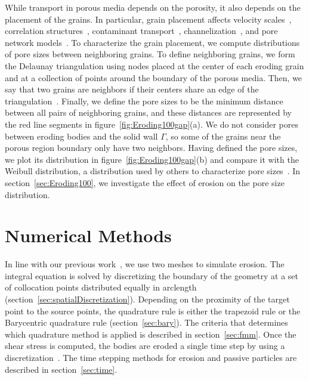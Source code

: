 \documentclass{jfm}
\begin{document}
While transport in porous media depends on the porosity, it also depends
on the placement of the grains.  In particular, grain placement affects
velocity scales~\citep{ali-par-wei-bre2017}, correlation
structures~\citep{leb-ded-dav-bou2007}, contaminant
transport~\citep{knu-car2005},
channelization~\citep{sie-ili-pri-riv-gua2019,berhanu2012shape}, and
pore network models~\citep{bry-kin-mel1993, bry-mel-cad1993,
bij-blu2006}. To characterize the grain placement, we compute
distributions of pore sizes between neighboring grains.  To define
neighboring grains, we form the Delaunay triangulation using nodes
placed at the center of each eroding grain and at a collection of points
around the boundary of the porous media.  Then, we say that two grains
are neighbors if their centers share an edge of the
triangulation~\citep{dea-qua-bir-jua2018}. Finally, we define the pore
sizes to be the minimum distance between all pairs of neighboring
grains, and these distances are represented by the red line segments in
figure~\ref{fig:Eroding100gap}(a). We do not consider pores between
eroding bodies and the solid wall $\Gamma$, so some of the grains near
the porous region boundary only have two neighbors. Having defined the
pore sizes, we plot its distribution in
figure~\ref{fig:Eroding100gap}(b) and compare it with the Weibull
distribution, a distribution used by others to characterize pore
sizes~\citep{ioa-cha1993}. In section~\ref{sec:Eroding100}, we
investigate the effect of erosion on the pore size distribution.

\section{Numerical Methods}
\label{sec:method}
In line with our previous work~\citep{qua-moo2018}, we use two meshes to
simulate erosion. The integral equation is solved by discretizing the
boundary of the geometry at a set of collocation points distributed
equally in arclength (section~\ref{sec:spatialDiscretization}).
Depending on the proximity of the target point to the source points, the
quadrature rule is either the trapezoid rule or the Barycentric
quadrature rule (section~\ref{sec:bary}). The criteria that determines
which quadrature method is applied is described in
section~\ref{sec:fmm}.  Once the shear stress is computed, the bodies
are eroded a single time step by using a {\thL}
discretization~\citep{hou-low-she1994, moore2013self}.  The time
stepping methods for erosion and passive particles are described in
section~\ref{sec:time}.
\end{document}
